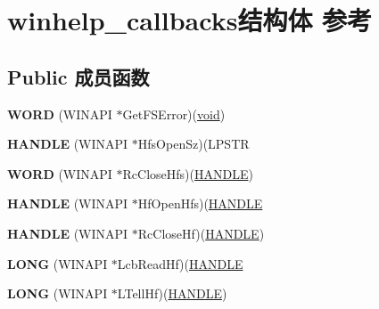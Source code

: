 \hypertarget{structwinhelp__callbacks}{}\section{winhelp\+\_\+callbacks结构体 参考}
\label{structwinhelp__callbacks}
\subsection*{Public 成员函数}
\begin{DoxyCompactItemize}
\item 
\mbox{\label{structwinhelp__callbacks_a8d43ddccb44937d8dcea7e4a3230c555}} 
{\bfseries W\+O\+RD} (W\+I\+N\+A\+PI $\ast$Get\+F\+S\+Error)(\hyperlink{interfacevoid}{void})
\item 
\mbox{\label{structwinhelp__callbacks_a288e24ce45814dfdad5505e8e9983d33}} 
{\bfseries H\+A\+N\+D\+LE} (W\+I\+N\+A\+PI $\ast$Hfs\+Open\+Sz)(L\+P\+S\+TR
\item 
\mbox{\label{structwinhelp__callbacks_ac11992bf09aa406e369ebf53f9b96f8d}} 
{\bfseries W\+O\+RD} (W\+I\+N\+A\+PI $\ast$Rc\+Close\+Hfs)(\hyperlink{interfacevoid}{H\+A\+N\+D\+LE})
\item 
\mbox{\label{structwinhelp__callbacks_af9e39a73d5cbb3bca653cee957342156}} 
{\bfseries H\+A\+N\+D\+LE} (W\+I\+N\+A\+PI $\ast$Hf\+Open\+Hfs)(\hyperlink{interfacevoid}{H\+A\+N\+D\+LE}
\item 
\mbox{\label{structwinhelp__callbacks_a6184117f1ac1c5d224979a3c96b973e3}} 
{\bfseries H\+A\+N\+D\+LE} (W\+I\+N\+A\+PI $\ast$Rc\+Close\+Hf)(\hyperlink{interfacevoid}{H\+A\+N\+D\+LE})
\item 
\mbox{\label{structwinhelp__callbacks_aff2f56818fc66014e79615219b23c478}} 
{\bfseries L\+O\+NG} (W\+I\+N\+A\+PI $\ast$Lcb\+Read\+Hf)(\hyperlink{interfacevoid}{H\+A\+N\+D\+LE}
\item 
\mbox{\label{structwinhelp__callbacks_aef0bc70904c3b05ed303881114bfdb8d}} 
{\bfseries L\+O\+NG} (W\+I\+N\+A\+PI $\ast$L\+Tell\+Hf)(\hyperlink{interfacevoid}{H\+A\+N\+D\+LE})

\end{DoxyCompactItemize}
